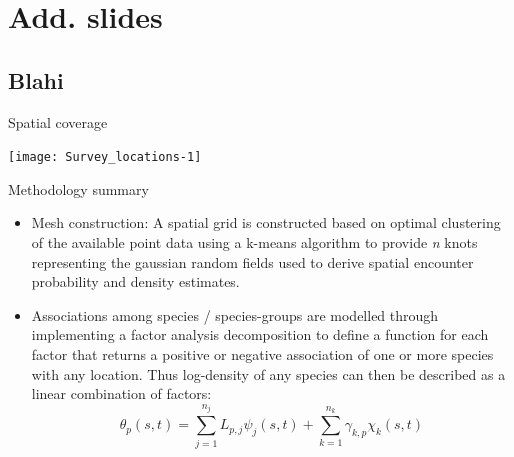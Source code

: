 \documentclass[xcolor=x11names,compress]{beamer}
\renewcommand{\(}{\begin{columns}}
\renewcommand{\)}{\end{columns}}
\newcommand{\<}[1]{\begin{column}{#1}}
\renewcommand{\>}{\end{column}}
\begin{document}
\begin{frame}{} 


\end{frame}



\appendix
\section{Add. slides}
\subsection{Blahi}


\begin{frame}{Spatial coverage}

\centering
\texttt{[image: Survey\_locations-1]}

\end{frame}


\begin{frame}{Methodology summary}

\begin{itemize}
	\small
	\setlength\itemsep{2em}

	\item Mesh construction: A spatial grid is constructed based on optimal
		clustering of the available point data using a k-means
		algorithm to provide \textit{n} knots representing the gaussian
		random fields used to derive spatial encounter probability and
		density estimates.

	\item  Associations among species / species-groups are modelled through
		implementing a factor analysis decomposition to define a
		function for each factor that returns a positive or negative
		association of one or more species with any location. Thus
		log-density of any species can then be described as a linear
		combination of factors:
		\begin{equation}
			\theta_{p}(s,t) = \sum_{j=1}^{n_{j}}
			L_{p,j}\psi_{j}(s,t) +\sum_{k=1}^{n_{k}}
			\gamma_{k,p}\chi_{k}(s,t)
		\end{equation}
	
\end{itemize}

\end{frame}
\end{document}
